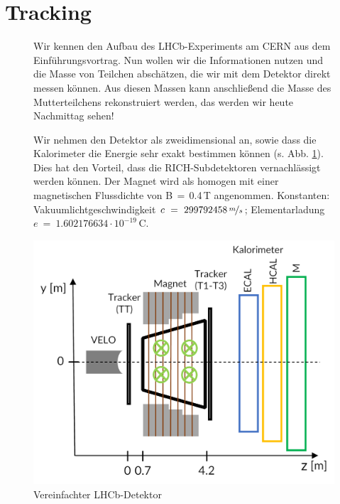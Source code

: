 \section*{Tracking}
\begin{figure}[h]
     \begin{minipage}[t]{0.6\textwidth}
      \vspace{-6cm} Wir kennen den Aufbau des LHCb-Experiments am CERN aus dem Einführungsvortrag. Nun wollen wir die Informationen nutzen und die Masse von Teilchen abschätzen, die wir mit dem Detektor direkt messen können. Aus diesen Massen kann anschließend die Masse des Mutterteilchens rekonstruiert werden, das werden wir heute Nachmittag sehen! 
      
      Wir nehmen den Detektor als zweidimensional an, sowie dass die Kalorimeter die Energie sehr exakt bestimmen können (s. Abb. \ref{fig: Der Detektor}). Dies hat den Vorteil, dass die RICH-Subdetektoren vernachlässigt werden können. Der Magnet wird als homogen mit einer magnetischen Flussdichte von B$\,=\,$0.4\,T angenommen.  Konstanten: Vakuumlichtgeschwindigkeit $c~=~ 299792458 \, \nicefrac{m}{s}$; Elementarladung $e~=~ 1.602176634\cdot10^{-19}$\,C.  \end{minipage}
            \begin{minipage}[t]{0.4\textwidth}
            \centering
            \includegraphics[width=\textwidth]{Figures Worksheets/LHCb_Calculation_LHCb_Detector_DE.png} 
            \caption{Vereinfachter LHCb-Detektor} \label{fig: Der Detektor}
            \end{minipage}
            \end{figure}
